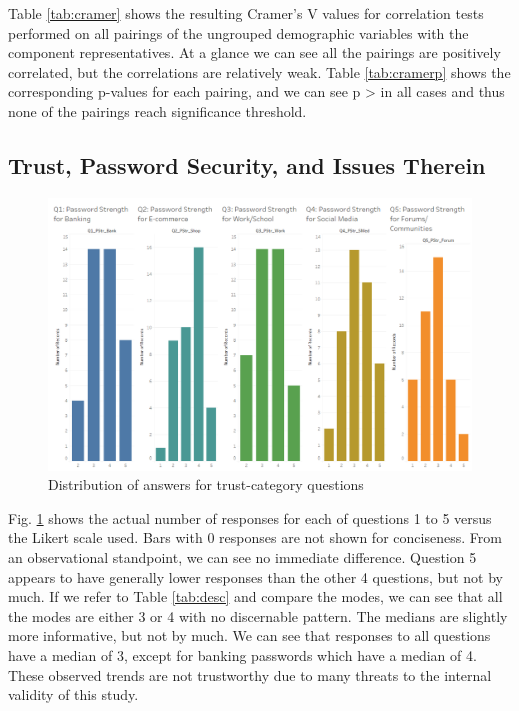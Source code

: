 \documentclass[letterpaper, 10 pt, conference]{ieeeconf}  %
\begin{document}
Table \ref{tab:cramer} shows the resulting Cramer’s V values for correlation tests performed on all pairings of the ungrouped demographic variables with the component representatives. At a glance we can see all the pairings are positively correlated, but the correlations are relatively weak. Table \ref{tab:cramerp} shows the corresponding p-values for each pairing, and we can see p > \textalpha{} in all cases and thus none of the pairings reach significance threshold.

\subsection{Trust, Password Security, and Issues Therein}

  \begin{figure}[thpb]
  \includegraphics[width=1.0\textwidth]{barsQ1Q5.PNG}
     \caption{Distribution of answers for trust-category questions}
         \label{fig:barchart}
  \end{figure}

Fig. \ref{fig:barchart} shows the actual number of responses for each of questions 1 to 5 versus the Likert scale used. Bars with 0 responses are not shown for conciseness. From an observational standpoint, we can see no immediate difference. Question 5 appears to have generally lower responses than the other 4 questions, but not by much. If we refer to Table \ref{tab:desc} and compare the modes, we can see that all the modes are either 3 or 4 with no discernable pattern. The medians are slightly more informative, but not by much. We can see that responses to all questions have a median of 3, except for banking passwords which have a median of 4. These observed trends are not trustworthy due to many threats to the internal validity of this study.
\end{document}
